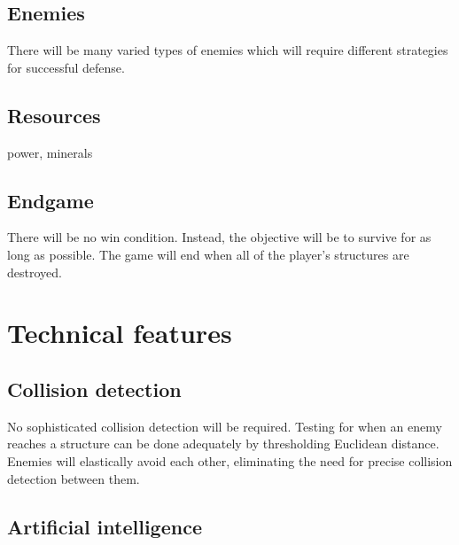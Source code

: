 \documentclass[a4paper,titlepage]{article}
\begin{document}
\subsection{Enemies}

There will be many varied types of enemies which will require different strategies for successful defense.

\subsection{Resources}

power, minerals

\subsection{Endgame}

There will be no win condition.  Instead, the objective will be to survive for as long as possible.  The game will end when all of the player's structures are destroyed.

\section{Technical features}

\subsection{Collision detection}

No sophisticated collision detection will be required.  Testing for when an enemy reaches a structure can be done adequately by thresholding Euclidean distance.  Enemies will elastically avoid each other, eliminating the need for precise collision detection between them.

\subsection{Artificial intelligence}
\end{document}
